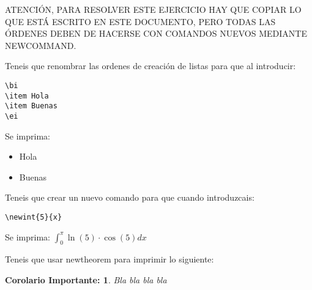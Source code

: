 \documentclass[a4paper,10pt]{article}
\newcommand{\bi}{\begin{itemize}}
\newcommand{\ei}{\end{itemize}}
\newcommand{\newint}[2]{$\displaystyle \int_0^{\pi} \ln(#1)\cdot \cos(#1) d#2$}
\newtheorem{coro}{Corolario Importante:}
\begin{document}
\begin{center}
\textsc{ATENCIÓN, PARA RESOLVER ESTE EJERCICIO HAY QUE COPIAR LO QUE ESTÁ ESCRITO EN ESTE DOCUMENTO, PERO TODAS
LAS ÓRDENES DEBEN DE HACERSE CON COMANDOS NUEVOS MEDIANTE NEWCOMMAND.} 
\end{center}



Teneis que renombrar las ordenes de creación de listas para que al introducir:
\begin{verbatim}
\bi
\item Hola
\item Buenas
\ei
\end{verbatim}

Se imprima:
\bi
\item Hola
\item Buenas
\ei

\vspace{2cm}

Teneis que crear un nuevo comando para que cuando introduzcais:
\begin{verbatim}
\newint{5}{x}
\end{verbatim}
Se imprima:
\newint{5}{x}

\vspace{2cm}


Teneis que usar newtheorem para imprimir lo siguiente:
\begin{coro}
Bla bla bla bla
\end{coro}
\end{document}
